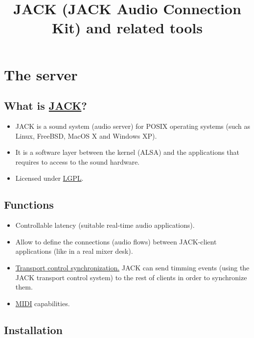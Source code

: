 \title{JACK (JACK Audio Connection Kit) and related tools}

\maketitle
\tableofcontents

\chapter{The server}

\section{What is \href{http://jackaudio.org/}{JACK}?}
\begin{itemize}
\item JACK is a sound system (audio server) for POSIX operating
  systems (such as Linux, FreeBSD, MacOS X and Windows XP).
\item It is a software layer between the kernel (ALSA) and the
  applications that requires to access to the sound hardware.
\item Licensed under \href{https://www.gnu.org/licenses/lgpl.html}{LGPL}.
\end{itemize}


\section{Functions}

\begin{itemize}
\item Controllable latency (suitable real-time audio applications).
\item Allow to define the connections (audio flows) between JACK-client
  applications (like in a real mixer desk).
\item \href{http://www.linuxjournal.com/node/1004080}{Transport
    control synchronization.} JACK can send timming events (using the
  JACK transport control system) to the rest of clients in order to
  synchronize them.
\item \href{http://en.wikipedia.org/wiki/MIDI}{MIDI} capabilities.
\end{itemize}


\section{Installation}

